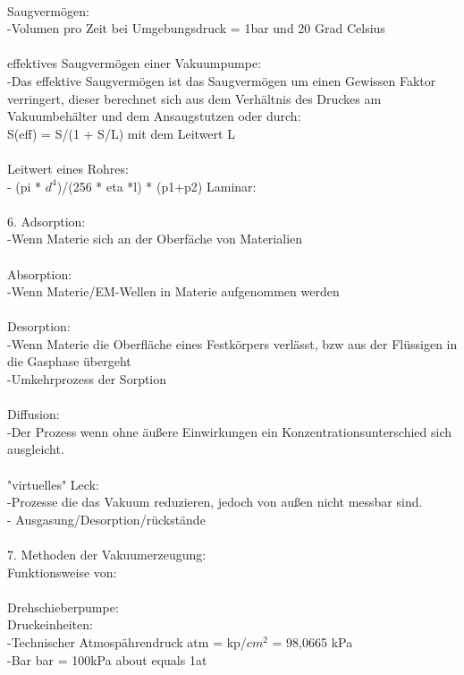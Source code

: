 \\
	   Saugvermögen:\\
	   	-Volumen pro Zeit bei Umgebungsdruck = 1bar und 20 Grad Celsius\\
\\
	   effektives Saugvermögen einer Vakuumpumpe:\\
	   	-Das effektive Saugvermögen ist das Saugvermögen um einen Gewissen Faktor verringert, dieser berechnet sich aus dem Verhältnis des Druckes am Vakuumbehälter und dem Ansaugstutzen oder durch:\\
			S(eff) = S/(1 + S/L) mit dem Leitwert L\\
\\
	   Leitwert eines Rohres:\\
		- (pi * $d^4$)/(256 * eta *l) * (p1+p2) Laminar:\\
\\
	6. Adsorption:\\
		-Wenn Materie sich an der Oberfäche von Materialien \\ 
\\
	   Absorption:\\
		-Wenn Materie/EM-Wellen in Materie aufgenommen werden\\
\\
	   Desorption:\\
		-Wenn Materie die Oberfläche eines Festkörpers verlässt, bzw aus der Flüssigen in die Gasphase übergeht\\
		-Umkehrprozess der Sorption\\
\\
	   Diffusion:\\
		-Der Prozess wenn ohne äußere Einwirkungen ein Konzentrationsunterschied sich ausgleicht.\\
		\\
	   "virtuelles" Leck:\\
	   	-Prozesse die das Vakuum reduzieren, jedoch von außen nicht messbar sind.\\
		- Ausgasung/Desorption/rückstände\\
\\
	7. Methoden der Vakuumerzeugung:\\
		Funktionsweise von:\\
\\
		Drehschieberpumpe:\\
	   Druckeinheiten:\\
	   	-Technischer Atmospährendruck atm = kp/$cm^2$ = 98,0665 kPa \\
		-Bar bar = 100kPa about equals 1at\\

